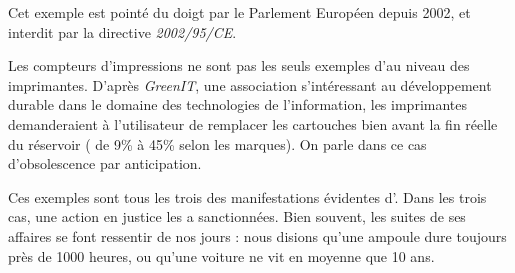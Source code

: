 Cet exemple est pointé du doigt par le Parlement Européen depuis 2002, et interdit par la directive \textit{2002/95/CE}. 
\smallbreak

Les compteurs d'impressions ne sont pas les seuls exemples d'\op au niveau des imprimantes. D'après \textit{GreenIT}\cite{greenit_cartouche_encre}, une association s'intéressant au développement durable  dans le domaine des technologies de l'information, les imprimantes demanderaient à l'utilisateur de remplacer les cartouches bien avant la fin réelle du réservoir ( de 9\% à 45\% selon les marques). On parle dans ce cas d'obsolescence par anticipation.


\medbreak

Ces exemples sont tous les trois des manifestations évidentes d'\op. Dans les trois cas, une action en justice les a sanctionnées. Bien souvent, les suites de ses affaires se font ressentir de nos jours : nous disions qu'une ampoule dure toujours près de 1000 heures, ou qu'une voiture ne vit en moyenne que 10 ans. 
